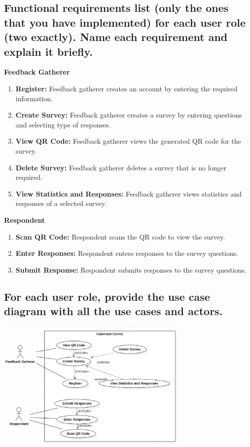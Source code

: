 \documentclass[letterpaper, 12 pt, conference]{ieeeconf}
\begin{document}
\subsection{Functional requirements list (only the ones that you have implemented) for each user role (two exactly). Name each requirement and explain it briefly.}
\linebreak

\textbf{Feedback Gatherer}
\begin{enumerate}
   \item \textbf{Register:} Feedback gatherer creates an account by entering the required information. 
   \item \textbf{Create Survey:} Feedback gatherer creates a survey by entering questions and selecting type of responses.
   \item \textbf{View QR Code:} Feedback gatherer views the generated QR code for the survey.
   \item \textbf{Delete Survey:} Feedback gatherer deletes a survey that is no longer required.
   \item \textbf{View Statistics and Responses:} Feedback gatherer views statistics and responses of a selected survey.
\end{enumerate}

\newline 
\hfill \break

\textbf{Respondent}
\begin{enumerate}
   \item \textbf{Scan QR Code:} Respondent scans the QR code to view the survey.
   \item \textbf{Enter Responses:} Respondent enters responses to the survey questions.
   \item \textbf{Submit Response:} Respondent submits responses to the survey questions.
\end{enumerate}

\newpage

\subsection{For each user role, provide the use case diagram with all the use cases and actors.}
\hfill \break

\includegraphics[width=0.70\textwidth]{caseDiagram.png}
\end{document}

